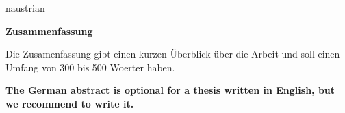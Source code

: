 \newpage
\begin{otherlanguage*}{naustrian}

\vspace*{2.2 cm}
\Large
\noindent
{\bf Zusammenfassung} \\
\vspace*{0.3 cm}

\normalsize
\noindent
Die Zusamenfassung gibt einen kurzen \"Uberblick \"uber die Arbeit und soll einen Umfang von 300 bis 500 Woerter haben. \\

\vspace{5 cm}
\begin{center}
{\bf \Large The German abstract is optional for a thesis written in English, but we recommend to write it.}
\end{center}

\end{otherlanguage*}